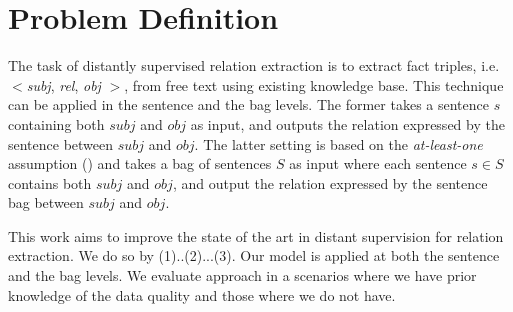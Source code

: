 \section{Problem Definition}
The task of distantly supervised relation extraction is to extract fact triples, i.e. $<$\emph{subj},  \emph{rel},
\emph{obj} $>$, from free text using existing knowledge base. This technique can be applied in the sentence and the bag
levels.  The former  takes a sentence $s$ containing both $subj$ and $obj$ as input, and outputs the relation expressed
by the sentence between $subj$ and $obj$. The latter setting is based on the \textit{at-least-one} assumption
() and takes a bag of sentences $S$ as input where each sentence
$s\in S$ contains both $subj$ and
$obj$, and output  the relation expressed by the sentence bag between $subj$ and $obj$.


This work aims to improve the state of the art in distant supervision for relation extraction. 
We do so by (1)..(2)...(3).
Our model is applied at both the sentence and the bag levels. We evaluate approach
in a scenarios where we have prior knowledge of the data quality and those where we do not have. 





%
